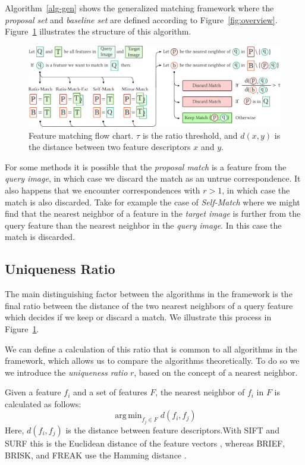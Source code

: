 \documentclass[review]{elsarticle}
\DeclareMathOperator*{\argmin}{arg\,min}
\begin{document}
Algorithm~\ref{alg-gen} shows the generalized matching framework where the \emph{proposal set} and \emph{baseline set} are defined according to Figure~\ref{fig:overview}. Figure~\ref{fig:matching} illustrates the structure of this algorithm.


\begin{figure}[htb]
\centering
\includegraphics[width=\columnwidth]{images/matching-wide}
\caption{Feature matching flow chart. $\tau$ 
is the ratio threshold, and $d(x,y)$ is the distance between two feature 
descriptors $x$ and $y$.}
\label{fig:matching}
\end{figure}
%

For some methods it is possible that the \emph{proposal match} is a feature from the \emph{query image}, in which case we discard the match as an untrue correspondence.  It also happens that we encounter correspondences with $r>1$, in which case the match is also discarded.  Take for example the case of \emph{Self-Match} where we might find that the nearest neighbor of a feature in the \emph{target image} is further from the query feature than the nearest neighbor in the \emph{query image}. In this case the match is discarded. 

%
\subsection{Uniqueness Ratio}
%

The main distinguishing factor between the algorithms in the framework is the final ratio between the distance of the two nearest neighbors of a query feature which decides if we keep or discard a match. We illustrate this process in Figure~\ref{fig:matching}.

We can define a calculation of this ratio that is common to all algorithms in the framework, which allows us to compare the algorithms theoretically. To do so we we introduce the \emph{uniqueness ratio} $r$, based on the concept of a nearest neighbor.

Given a feature $f_i$ and a set of features $F$, the nearest neighbor of $f_i$ in $F$ is calculated as follows: 
\begin{equation*}
\argmin_{f_j \in F} d(f_i, f_j)
\end{equation*}
Here, $d(f_i, f_j)$ is the distance between feature descriptors.With SIFT and SURF this is the Euclidean distance of the feature vectors \cite{lowe2004sift,bay2006surf}, whereas BRIEF, BRISK, and FREAK use the Hamming distance \cite{leutenegger2011brisk,calonder2010brief,alahi2012freak}.  
\end{document}
